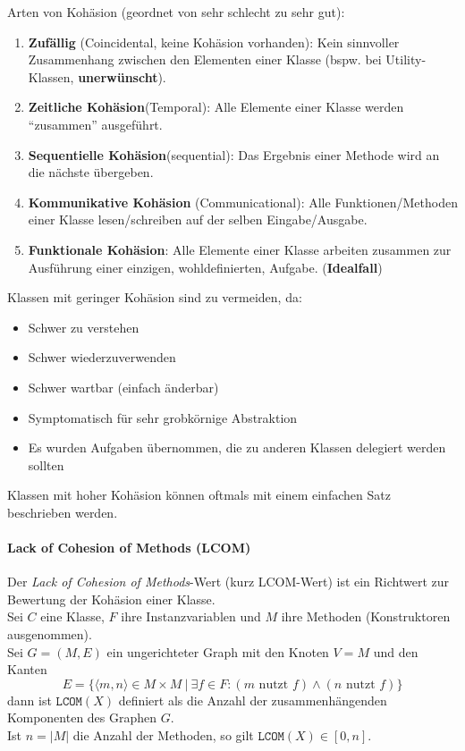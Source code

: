 \documentclass[
    ngerman,
    color=3b,
    summary,
    boxarc,
    main,
]{rubos-tuda-template}
\begin{document}
Arten von Kohäsion (geordnet von sehr schlecht zu sehr gut):
\begin{enumerate}
    \item \textbf{Zufällig} (Coincidental, keine Kohäsion vorhanden): Kein sinnvoller Zusammenhang zwischen den Elementen einer Klasse (bspw. bei Utility-Klassen, \textbf{unerwünscht}).
    \item \textbf{Zeitliche Kohäsion}(Temporal): Alle Elemente einer Klasse werden \enquote{zusammen} ausgeführt.
    \item \textbf{Sequentielle Kohäsion}(sequential): Das Ergebnis einer Methode wird an die nächste übergeben.
    \item \textbf{Kommunikative Kohäsion} (Communicational): Alle Funktionen/Methoden einer Klasse lesen/schreiben auf der selben Eingabe/Ausgabe.
    \item \textbf{Funktionale Kohäsion}: Alle Elemente einer Klasse arbeiten zusammen zur Ausführung einer einzigen, wohldefinierten, Aufgabe. (\textbf{Idealfall})
\end{enumerate}

Klassen mit geringer Kohäsion sind zu vermeiden, da:
\begin{itemize}
    \item Schwer zu verstehen
    \item Schwer wiederzuverwenden
    \item Schwer wartbar (einfach änderbar)
    \item Symptomatisch für sehr grobkörnige Abstraktion
    \item Es wurden Aufgaben übernommen, die zu anderen Klassen delegiert werden sollten
\end{itemize}
Klassen mit hoher Kohäsion können oftmals mit einem einfachen Satz beschrieben werden.

\paragraph{Lack of Cohesion of Methods (LCOM)}\mbox{}\par
\begin{definition}
    Der \textit{Lack of Cohesion of Methods}-Wert (kurz LCOM-Wert) ist ein Richtwert zur Bewertung der Kohäsion einer Klasse.\\
    Sei $ C $ eine Klasse, $ F $ ihre Instanzvariablen und $ M $ ihre Methoden (Konstruktoren ausgenommen).\\
    Sei $ G = (M, E) $ ein ungerichteter Graph mit den Knoten $ V = M $ und den Kanten
    \[ E = \{ \langle m, n\rangle \in M \times M~|~\exists f \in F : (m \text{ nutzt } f) \land (n \text{ nutzt } f) \} \]
    dann ist $ \texttt{LCOM}(X) $ definiert als die Anzahl der zusammenhängenden Komponenten des Graphen $ G $.\\
    Ist $ n=\vert M \vert $ die Anzahl der Methoden, so gilt $ \texttt{LCOM}(X) \in [0, n] $.
\end{definition}
\end{document}
